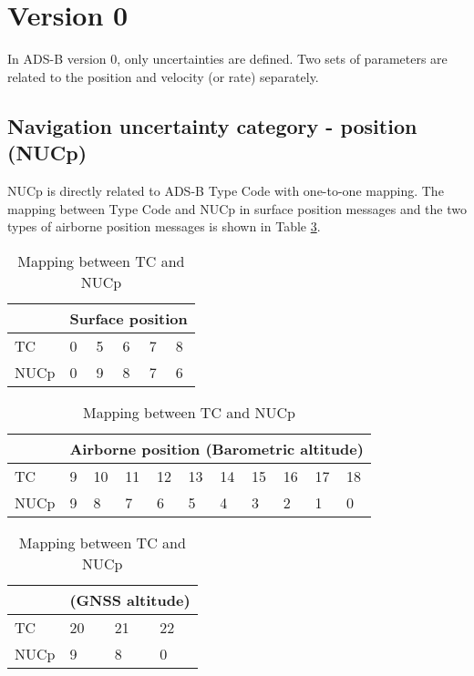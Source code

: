 \section{Version 0}

In ADS-B version 0, only uncertainties are defined. Two sets of parameters are related to the position and velocity (or rate) separately.

\subsection{Navigation uncertainty category - position (NUCp)}

NUCp is directly related to ADS-B Type Code with one-to-one mapping. The mapping between Type Code and NUCp in surface position messages and the two types of airborne position messages is shown in Table \ref{tb:tc-nucp-mapping}.


\begin{table}[ht]
\caption{Mapping between TC and NUCp}
\label{tb:tc-nucp-mapping}

\begin{subtable}[t]{0.7\linewidth}
\begin{tabular}{|l||l|l|l|l|l|}
\hline
 & \multicolumn{5}{l|}{Surface position}  \\ \hline
TC & 0 & 5 & 6 & 7 & 8 \\ \hline
NUCp & 0 & 9 & 8 & 7 & 6 \\ \hline
\end{tabular}
\end{subtable}

\vspace{0.2cm}

\begin{subtable}[t]{0.7\linewidth}
\begin{tabular}{|l||l|l|l|l|l|l|l|l|l|l|}
\hline
  & \multicolumn{10}{l|}{Airborne position (Barometric altitude)} \\ \hline
TC & 9 & 10 & 11 & 12 & 13 & 14 & 15 & 16 & 17 & 18 \\ \hline
NUCp & 9 & 8 & 7 & 6 & 5 & 4 & 3 & 2 & 1 & 0 \\ \hline
\end{tabular}
\end{subtable}

\vspace{0.2cm}

\begin{subtable}[t]{0.7\linewidth}
\begin{tabular}{|l||l|l|l|}
\hline
  & \multicolumn{3}{l|}{(GNSS altitude)} \\ \hline
TC & 20 & 21 & 22 \\ \hline
NUCp & 9 & 8 & 0 \\ \hline
\end{tabular}
\end{subtable}

\end{table}

